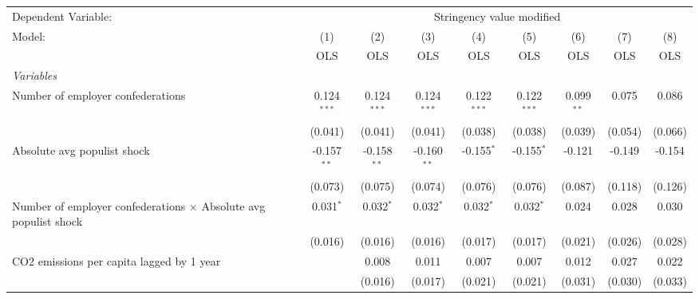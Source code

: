 
\begingroup
\centering
\begin{tabular}{lcccccccc}
   \toprule
   Dependent Variable: & \multicolumn{8}{c}{Stringency value modified}\\
   Model:                                                                  & (1)           & (2)           & (3)           & (4)           & (5)           & (6)          & (7)          & (8)\\  
                                                                           &  OLS          & OLS           & OLS           & OLS           & OLS           & OLS          & OLS          & OLS\\  
   \midrule
   \emph{Variables}\\
   Number of employer confederations                                       & 0.124$^{***}$ & 0.124$^{***}$ & 0.124$^{***}$ & 0.122$^{***}$ & 0.122$^{***}$ & 0.099$^{**}$ & 0.075        & 0.086\\   
                                                                           & (0.041)       & (0.041)       & (0.041)       & (0.038)       & (0.038)       & (0.039)      & (0.054)      & (0.066)\\   
   Absolute avg populist shock                                             & -0.157$^{**}$ & -0.158$^{**}$ & -0.160$^{**}$ & -0.155$^{*}$  & -0.155$^{*}$  & -0.121       & -0.149       & -0.154\\   
                                                                           & (0.073)       & (0.075)       & (0.074)       & (0.076)       & (0.076)       & (0.087)      & (0.118)      & (0.126)\\   
   Number of employer confederations $\times$ Absolute avg populist shock  & 0.031$^{*}$   & 0.032$^{*}$   & 0.032$^{*}$   & 0.032$^{*}$   & 0.032$^{*}$   & 0.024        & 0.028        & 0.030\\   
                                                                           & (0.016)       & (0.016)       & (0.016)       & (0.017)       & (0.017)       & (0.021)      & (0.026)      & (0.028)\\   
   CO2 emissions per capita lagged by 1 year                               &               & 0.008         & 0.011         & 0.007         & 0.007         & 0.012        & 0.027        & 0.022\\   
                                                                           &               & (0.016)       & (0.017)       & (0.021)       & (0.021)       & (0.031)      & (0.030)      & (0.033)\\   

\end{tabular}
